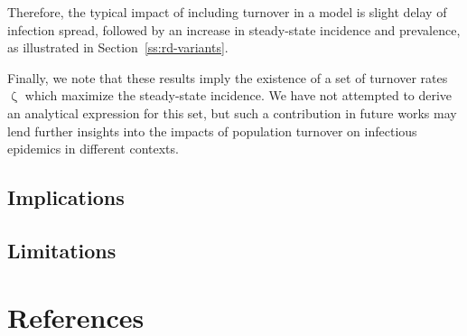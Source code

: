 \documentclass[10pt]{article}
\numberwithin{equation}{section}
\renewcommand{\zeta}{\upzeta}
\begin{document}
Therefore, the typical impact of including turnover in a model
is slight delay of infection spread,
followed by an increase in steady-state incidence and prevalence,
as illustrated in Section~\ref{ss:rd-variants}.
\par
Finally, we note that these results imply the existence of
a set of turnover rates $\zeta$ which maximize the steady-state incidence.
We have not attempted to derive an analytical expression for this set,
but such a contribution in future works may lend
further insights into the impacts of population turnover on
infectious epidemics in different contexts.
\subsection{Implications}
\subsection{Limitations}
\clearpage
\section{References}\label{s:references}
\printbibliography[heading=none]
\clearpage\appendix
\end{document}
